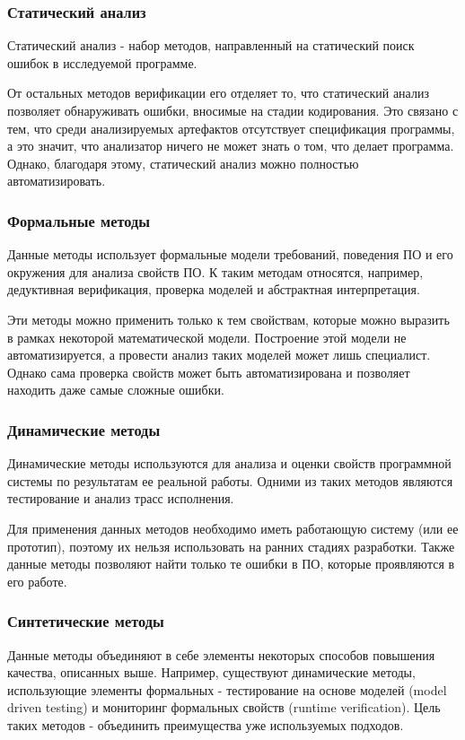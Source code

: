 \subsubsection{Статический анализ} %

Статический анализ - набор методов, направленный на статический поиск ошибок в
исследуемой программе.

От остальных методов верификации его отделяет то, что статический анализ
позволяет обнаруживать ошибки, вносимые на стадии кодирования. Это связано с
тем, что среди анализируемых артефактов отсутствует спецификация программы, а
это значит, что  анализатор ничего не может знать о том, что делает программа.
Однако, благодаря этому, статический анализ можно полностью автоматизировать.

\subsubsection{Формальные методы} %

Данные методы использует формальные модели требований, поведения ПО и его
окружения для анализа свойств ПО. К таким методам относятся, например,
дедуктивная верификация, проверка моделей и абстрактная интерпретация.

Эти методы можно применить только к тем свойствам, которые можно выразить в
рамках некоторой математической модели. Построение этой модели не
автоматизируется, а провести анализ таких моделей может лишь специалист. Однако
сама проверка свойств может быть автоматизирована и позволяет находить даже
самые сложные ошибки.

\subsubsection{Динамические методы} %

Динамические методы используются для анализа и оценки свойств программной
системы по результатам ее реальной работы. Одними из таких методов
являются тестирование и анализ трасс исполнения.

Для применения данных методов необходимо иметь работающую систему (или ее
прототип),  поэтому их нельзя использовать на ранних стадиях разработки. Также
данные методы позволяют найти только те ошибки в ПО, которые проявляются в его
работе.

\subsubsection{Синтетические методы} %

Данные методы объединяют в себе элементы некоторых способов повышения качества,
описанных выше. Например, существуют динамические методы, использующие элементы
формальных - тестирование на основе моделей (model driven testing) и мониторинг
формальных свойств (runtime verification). Цель таких методов - объединить
преимущества уже используемых подходов.
